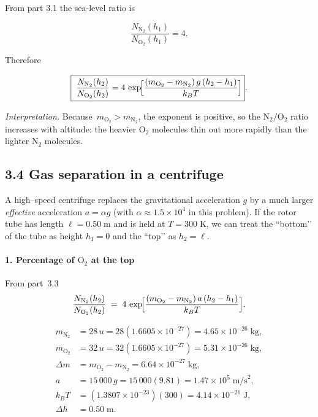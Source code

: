 \documentclass[12pt]{article}
\theoremstyle{definition} %
\theoremstyle{plain} %
\begin{document}
From part 3.1 the sea-level ratio is  

\[
  \frac{N_{\mathrm{N_2}}(h_1)}{N_{\mathrm{O_2}}(h_1)} = 4 .
\]

Therefore

\[
  \boxed{\;
    \frac{N_{\mathrm{N_2}}(h_2)}{N_{\mathrm{O_2}}(h_2)}
    = 4\,
      \exp\!\Bigl[
        \frac{(m_{\mathrm{O_2}}-m_{\mathrm{N_2}})\,g\,(h_2-h_1)}
             {k_B T}
      \Bigr]
  }.
\]

\emph{Interpretation.}  
Because \(\,m_{\mathrm{O_2}}>m_{\mathrm{N_2}}\), the exponent is positive,
so the \(\mathrm{N_2}/\mathrm{O_2}\) ratio increases with altitude:
the heavier \(\mathrm{O_2}\) molecules thin out more rapidly than the lighter
\(\mathrm{N_2}\) molecules.
\subsection*{3.4  Gas separation in a centrifuge}

A high–speed centrifuge replaces the gravitational acceleration \(g\) by a
much larger \emph{effective} acceleration  
\(a = \alpha g\) (with \(\alpha \approx 1.5\times10^{4}\) in this problem).
If the rotor tube has length \(\ell = 0.50\;\text{m}\) and is held at
\(T = 300\;\text{K}\), we can treat the “bottom’’ of the tube as
height \(h_1 = 0\) and the “top’’ as \(h_2 = \ell\).

\paragraph{1.  Percentage of \(\mathrm{O_2}\) at the top}

From part~3.3
\[
  \frac{N_{\mathrm{N_2}}(h_2)}{N_{\mathrm{O_2}}(h_2)}
  \;=\;
  4\,
  \exp\!\Bigl[
      \frac{(m_{\mathrm{O_2}}-m_{\mathrm{N_2}})\,a\,(h_2-h_1)}
           {k_B T}
  \Bigr].
\]

\[
  \begin{aligned}
    m_{\mathrm{N_2}} &= 28\,u = 28(1.6605\times10^{-27}) = 4.65\times10^{-26}\;\text{kg},\\[2pt]
    m_{\mathrm{O_2}} &= 32\,u = 32(1.6605\times10^{-27}) = 5.31\times10^{-26}\;\text{kg},\\[2pt]
    \Delta m         &= m_{\mathrm{O_2}}-m_{\mathrm{N_2}}
                      = 6.64\times10^{-27}\;\text{kg},\\[2pt]
    a                &= 15\,000\,g = 15\,000(9.81) = 1.47\times10^{5}\;\text{m/s}^{2},\\[2pt]
    k_B T            &= (1.3807\times10^{-23})(300) = 4.14\times10^{-21}\;\text{J},\\[2pt]
    \Delta h         &= 0.50\;\text{m}.
  \end{aligned}
\]
\end{document}
